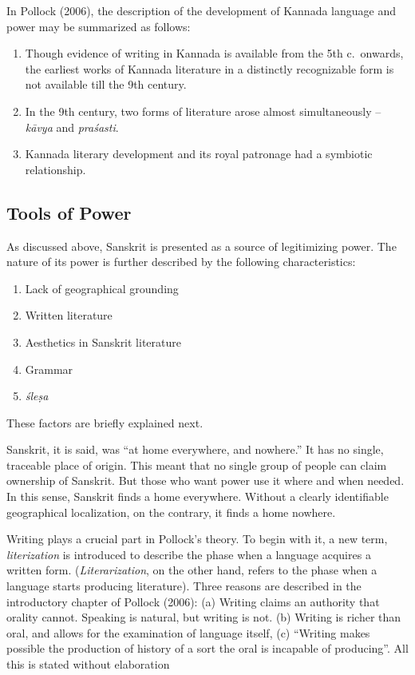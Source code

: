 In Pollock (2006), the description of the development of Kannada language and power may be summarized as follows: 
\begin{enumerate}
\itemsep=0pt
\item Though evidence of writing in Kannada is available from the 5th c.\ onwards, the earliest works of Kannada literature in a distinctly recognizable form is not available till the 9th century.
\item In the 9th century, two forms of literature arose almost simultaneously – {\sl kāvya} and {\sl praśasti}.
\item Kannada literary development and its royal patronage had a symbiotic relationship. 
\end{enumerate}

\subsection{Tools of Power}

As discussed above, Sanskrit is presented as a source of legitimizing power. The nature of its power is further described by the following characteristics:
\begin{enumerate}
\itemsep=0pt
\item Lack of geographical grounding
\item Written literature
\item Aesthetics in Sanskrit literature
\item Grammar
\item {\sl śleṣa}
\end{enumerate}

These factors are briefly explained next. 

Sanskrit, it is said, was “at home everywhere, and nowhere.” It has no single, traceable place of origin. This meant that no single group of people can claim ownership of Sanskrit. But those who want power use it where and when needed. In this sense, Sanskrit finds a home everywhere. Without a clearly identifiable geographical localization, on the contrary, it finds a home nowhere.

Writing plays a crucial part in Pollock’s theory. To begin with it, a new term, {\sl literization} is introduced to describe the phase when a language acquires a written form. ({\sl Literarization}, on the other hand, refers to the phase when a language starts producing literature). Three reasons are described in the introductory chapter of Pollock (2006): (a) Writing claims an authority that orality cannot. Speaking is natural, but writing is not. (b) Writing is richer than oral, and allows for the examination of language itself, (c) “Writing makes possible the production of history of a sort the oral is incapable of producing”. All this is stated without elaboration

